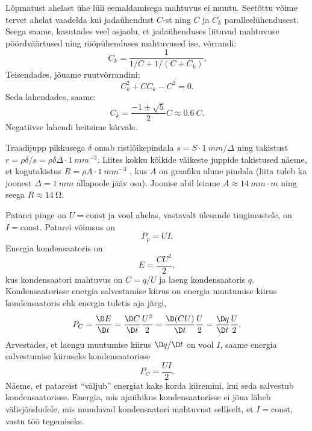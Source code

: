 \documentclass[10pt, twoside]{article}
\begin{document}
{%

\solu
Lõpmatust ahelast ühe lüli eemaldamisega mahtuvus ei muutu. Seetõttu võime tervet ahelat vaadelda kui jadaühendust $C$-st ning $C$ ja $C_k$ paralleelühendusest. Seega saame, kasutades veel asjaolu, et jadaühenduses liituvad mahtuvuse pöördväärtused ning rööpühenduses mahtuvused ise, võrrandi:
\[
C_{k}=\frac{1}{1 / C+1 /\left(C+C_{k}\right)}.
\]
Teisendades, jõuame ruutvõrrandini:
\[
C_{k}^{2}+C C_{k}-C^{2}=0.
\]
Seda lahendades, saame:
\[
C_{k}=\frac{-1 \pm \sqrt{5}}{2} C \approx \SI{0,6}{C}.
\]
Negatiivse lahendi heitsime kõrvale.
\probend
\bigskip


\solu
Traadijupp pikkusega $\delta$ omab ristlõikepindala $s = S \cdot \SI{1}{mm}/\Delta$ ning takistust $r = \rho \delta /s = \rho \delta \Delta \cdot \SI{1}{mm^{-3}}$. Liites kokku kõikide väikeste juppide takistused näeme, et kogutakistus $R = \rho A \cdot \SI{1}{mm^{-3}}$ , kus $A$ on graafiku alune pindala (liita tuleb ka joonest $\Delta = \SI{1}{mm}$ allapoole jääv osa). Joonise abil leiame $A \approx \SI{14}{mm\cdot m}$ ning seega $R \approx \SI{14}{\ohm}$.
\probend
\bigskip


\solu
Patarei pinge on $U=\text{const}$ ja vool ahelas, vastavalt ülesande tingimustele, on $I=\text{const}$. Patarei võimsus on
\[P_p=UI. \]
Energia kondensaatoris on
\[E=\frac{CU^2}{2}, \]
kus kondensaatori mahtuvus on $C=q/U$ ja laeng kondensaatoris $q$.
Kondensaatorisse energia salvestamise kiirus on energia muutumise kiirus kondensaatoris ehk energia tuletis aja järgi,
\[P_C=\frac{\D E}{\D t}=\frac{\D C}{\D t}\frac{U^2}{2}=\frac{\D (CU)}{\D t}\frac{U}{2}=\frac{\D q}{\D t}\frac{U}{2}.\]
Arvestades, et laengu muutumise kiirus $\D q/\D t$ on vool $I$, saame energia salvestumise kiiruseks kondensaatorisse
\[P_C=\frac{UI}{2}.\]
Näeme, et patareist \enquote{väljub} energiat kaks korda kiiremini, kui seda salvestub kondensaatorisse. Energia, mis ajaühikus kondensaatorisse ei jõua läheb välisjõududele, mis muudavad kondensaatori mahtuvust selliselt, et $I=\text{const}$, vastu töö tegemiseks.
\probend
\bigskip

}
\end{document}
